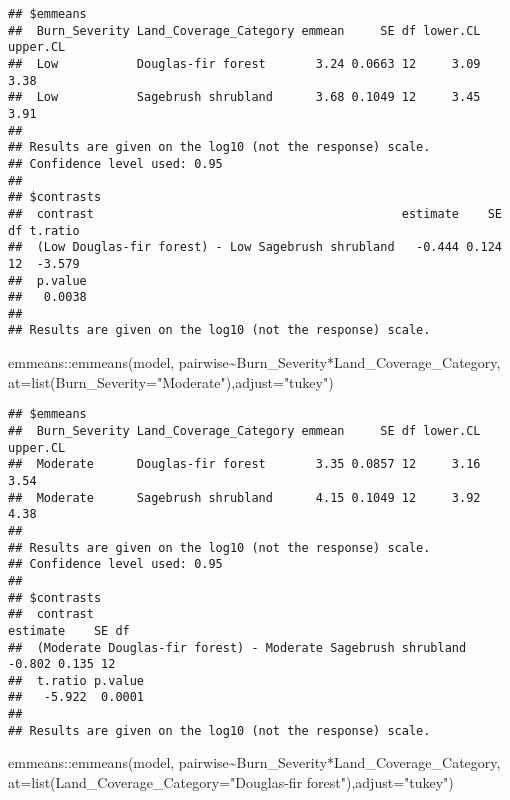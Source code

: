 \documentclass[
]{article}
\newenvironment{Shaded}{\begin{snugshade}}{\end{snugshade}}
\newcommand{\AttributeTok}[1]{\textcolor[rgb]{0.77,0.63,0.00}{#1}}
\newcommand{\FunctionTok}[1]{\textcolor[rgb]{0.00,0.00,0.00}{#1}}
\newcommand{\NormalTok}[1]{#1}
\newcommand{\SpecialCharTok}[1]{\textcolor[rgb]{0.00,0.00,0.00}{#1}}
\newcommand{\StringTok}[1]{\textcolor[rgb]{0.31,0.60,0.02}{#1}}
\begin{document}
\begin{verbatim}
## $emmeans
##  Burn_Severity Land_Coverage_Category emmean     SE df lower.CL upper.CL
##  Low           Douglas-fir forest       3.24 0.0663 12     3.09     3.38
##  Low           Sagebrush shrubland      3.68 0.1049 12     3.45     3.91
## 
## Results are given on the log10 (not the response) scale. 
## Confidence level used: 0.95 
## 
## $contrasts
##  contrast                                           estimate    SE df t.ratio
##  (Low Douglas-fir forest) - Low Sagebrush shrubland   -0.444 0.124 12  -3.579
##  p.value
##   0.0038
## 
## Results are given on the log10 (not the response) scale.
\end{verbatim}

\begin{Shaded}
\begin{Highlighting}[]
\NormalTok{emmeans}\SpecialCharTok{::}\FunctionTok{emmeans}\NormalTok{(model, pairwise}\SpecialCharTok{\textasciitilde{}}\NormalTok{Burn\_Severity}\SpecialCharTok{*}\NormalTok{Land\_Coverage\_Category, }\AttributeTok{at=}\FunctionTok{list}\NormalTok{(}\AttributeTok{Burn\_Severity=}\StringTok{"Moderate"}\NormalTok{),}\AttributeTok{adjust=}\StringTok{"tukey"}\NormalTok{) }
\end{Highlighting}
\end{Shaded}

\begin{verbatim}
## $emmeans
##  Burn_Severity Land_Coverage_Category emmean     SE df lower.CL upper.CL
##  Moderate      Douglas-fir forest       3.35 0.0857 12     3.16     3.54
##  Moderate      Sagebrush shrubland      4.15 0.1049 12     3.92     4.38
## 
## Results are given on the log10 (not the response) scale. 
## Confidence level used: 0.95 
## 
## $contrasts
##  contrast                                                     estimate    SE df
##  (Moderate Douglas-fir forest) - Moderate Sagebrush shrubland   -0.802 0.135 12
##  t.ratio p.value
##   -5.922  0.0001
## 
## Results are given on the log10 (not the response) scale.
\end{verbatim}

\begin{Shaded}
\begin{Highlighting}[]
\NormalTok{emmeans}\SpecialCharTok{::}\FunctionTok{emmeans}\NormalTok{(model, pairwise}\SpecialCharTok{\textasciitilde{}}\NormalTok{Burn\_Severity}\SpecialCharTok{*}\NormalTok{Land\_Coverage\_Category, }\AttributeTok{at=}\FunctionTok{list}\NormalTok{(}\AttributeTok{Land\_Coverage\_Category=}\StringTok{"Douglas{-}fir forest"}\NormalTok{),}\AttributeTok{adjust=}\StringTok{"tukey"}\NormalTok{) }
\end{Highlighting}
\end{Shaded}
\end{document}

